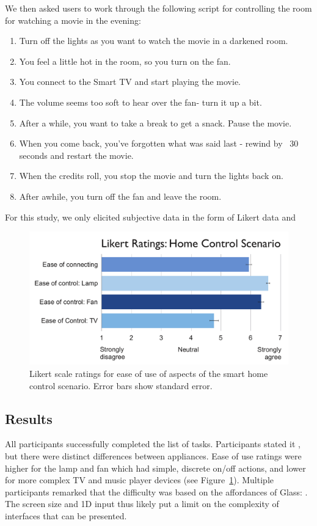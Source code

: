 We then asked users to work through the following script for controlling the room for watching a movie in the evening:
{\small
\begin{enumerate}
\item Turn off the lights as you want to watch the movie in a darkened room.
\item You feel a little hot in the room, so you turn on the fan.
\item You connect to the Smart TV and start playing the movie. 
\item The volume seems too soft to hear over the fan- turn it up a bit. 
\item After a while, you want to take a break to get a snack. Pause the movie. 
\item When you come back, you've forgotten what was said last - rewind by ~30 seconds and restart the movie. 
\item When the credits roll, you stop the movie and turn the lights back on.
\item After awhile, you turn off the fan and leave the room.
\end{enumerate}
}

For this study, we only elicited subjective data in the form of Likert data and 
\begin{figure}[b]
\centering
\includegraphics[width=1.0\columnwidth]{figures/scenario-likert.pdf}
\caption{Likert scale ratings for ease of use of aspects of the smart home control scenario. Error bars show standard error.}
\label{fig:smarthome-likert}
\end{figure}

\subsection{Results}
All participants successfully completed the list of tasks.
Participants stated it , but there were distinct differences between appliances. Ease of use ratings were higher for the lamp and fan which had simple, discrete on/off actions, and lower for more complex TV and music player devices (see Figure~\ref{fig:smarthome-likert}). Multiple participants remarked that the difficulty was based on the affordances of Glass: . The screen size and 1D input thus likely put a limit on the complexity of interfaces that can be presented.

